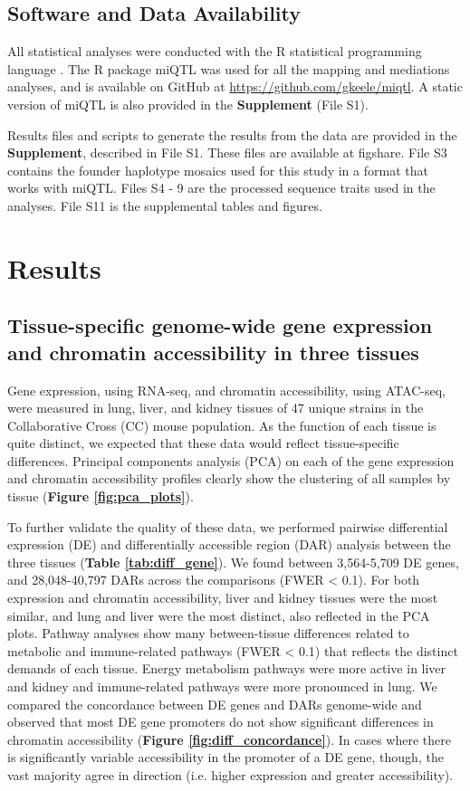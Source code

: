 \documentclass[9pt,twocolumn,twoside]{gsajnl}
\begin{document}
\subsection{Software and Data Availability}

All statistical analyses were conducted with the R statistical programming language \citep{RSoftware2019}. The R package miQTL was used for all the mapping and mediations analyses, and is available on GitHub at \url{https://github.com/gkeele/miqtl}. A static version of miQTL is also provided in the \textbf{Supplement} (File S1).

Results files and scripts to generate the results from the data are provided in the \textbf{Supplement}, described in File S1. These files are available at figshare. File S3 contains the founder haplotype mosaics used for this study in a format that works with miQTL. Files S4 - 9 are the processed sequence traits used in the analyses. File S11 is the supplemental tables and figures.

\section{Results}

\subsection{Tissue-specific genome-wide gene expression and chromatin accessibility in three tissues}

Gene expression, using RNA-seq, and chromatin accessibility, using ATAC-seq, were measured in lung, liver, and kidney tissues of 47 unique strains in the Collaborative Cross (CC) mouse population. As the function of each tissue is quite distinct, we expected that these data would reflect tissue-specific differences. Principal components analysis (PCA) on each of the gene expression and chromatin accessibility profiles clearly show the clustering of all samples by tissue (\textbf{Figure \ref{fig:pca_plots}}). 

To further validate the quality of these data, we performed pairwise differential expression (DE) and differentially accessible region (DAR) analysis between the three tissues (\textbf{Table \ref{tab:diff_gene}}). We found between 3,564-5,709 DE genes, and 28,048-40,797 DARs across the comparisons (FWER < 0.1). For both expression and chromatin accessibility, liver and kidney tissues were the most similar, and lung and liver were the most distinct, also reflected in the PCA plots. Pathway analyses show many between-tissue differences related to metabolic and immune-related pathways (FWER < 0.1) that reflects the distinct demands of each tissue. Energy metabolism pathways were more active in liver and kidney and immune-related pathways were more pronounced in lung. We compared the concordance between DE genes and DARs genome-wide and observed that most DE gene promoters do not show significant differences in chromatin accessibility (\textbf{Figure \ref{fig:diff_concordance}}). In cases where there is significantly variable accessibility in the promoter of a DE gene, though, the vast majority agree in direction (i.e. higher expression and greater accessibility).
\end{document}
